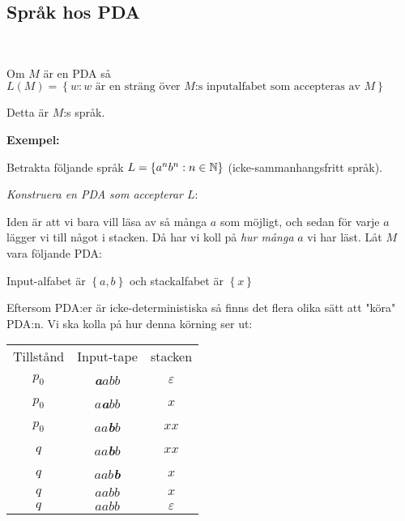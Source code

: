 \subsection{Språk hos PDA}\hfill\\\par
\noindent Om $M$ är en PDA så $L(M) = \left\{w:\text{$w$ är en sträng över $M$:s inputalfabet som accepteras av $M$}\right\}$\par
\noindent Detta är $M$:s språk.
\par\bigskip
\noindent\textbf{Exempel:}\par
\noindent Betrakta följande språk $L=\left\{a^nb^n:n\in\mathbb{N}\right\}$ (icke-sammanhangsfritt språk).\par
\noindent \textit{Konstruera en PDA som accepterar $L$}:\par
\noindent Iden är att vi bara vill läsa av så många $a$ som möjligt, och sedan för varje $a$ lägger vi till något i stacken. Då har vi koll på \textit{hur många} $a$ vi har läst. Låt $M$ vara följande PDA:
\begin{figure}[ht!]
    \centering
    \caption{}
\end{figure}\par
\noindent Input-alfabet är $\left\{a,b\right\}$ och stackalfabet är $\left\{x\right\}$
\par\bigskip
\noindent Eftersom PDA:er är icke-deterministiska så finns det flera olika sätt att "köra" PDA:n. Vi ska kolla på hur denna körning ser ut:\par
\begin{center}
  \begin{tabular}{c|c|c}
    Tillstånd&Input-tape&stacken\\
    $p_0$&\textbf{\textit{a}}$abb$&$\varepsilon$\\
    $p_0$&$a$\textbf{\textit{a}}$bb$&$x$\\
    $p_0$&$aa$\textit{\textbf{b}}$b$&$xx$\\
    $q$&$aa$\textit{\textbf{b}}$b$&$xx$\\
    $q$&$aab$\textit{\textbf{b}}&$x$\\
    $q$&$aabb$&$x$\\
    $q$&$aabb$&$\varepsilon$\\
  \end{tabular}
\end{center}

